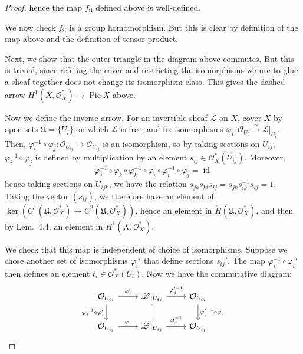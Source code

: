 \documentclass[10pt]{article}
\theoremstyle{definition}
\theoremstyle{remark}
\numberwithin{equation}{section}
\numberwithin{figure}{subsubsection}
\DeclareMathOperator{\Pic}{Pic}
\DeclareMathOperator{\id}{id}
\newcommand{\LL}{\mathscr{L}}
\newcommand{\OO}{\mathcal{O}}
\newcommand{\isoto}{\overset{\sim}{\to}}
\begin{document}
\begin{proof}
  hence the map $f_\mathfrak{U}$ defined above is well-defined.
  \par We now check $f_\mathfrak{U}$ is a group homomorphism. But this is clear
  by definition of the map above and the definition of tensor product.
  \par Next, we show that the outer triangle in the diagram above commutes. But
  this is trivial, since refining the cover and restricting the isomorphisms we
  use to glue a sheaf together does not change its isomorphism class. This gives
  the dashed arrow $H^1(X,\OO_X^*) \to \Pic X$ above.
  \par Now we define the inverse arrow.
  For an invertible sheaf $\LL$ on $X$, cover $X$ by open sets $\mathfrak{U} =
  \{U_i\}$ on which
  $\LL$ is free, and fix isomorphisms $\varphi_i\colon \OO_{U_i} \isoto
  \LL\rvert_{U_i}$. Then, $\varphi_i^{-1} \circ \varphi_j \colon
  \OO_{U_{ij}} \to \OO_{U_{ij}}$ is an isomorphism, so by taking sections on
  $U_{ij}$, $\varphi_i^{-1} \circ \varphi_j$ is defined by multiplication by an
  element $s_{ij} \in \OO^*_X(U_{ij})$. Moreover,
  \begin{equation*}
    \varphi_j^{-1} \circ \varphi_k \circ \varphi_k^{-1} \circ \varphi_i \circ
    \varphi_i^{-1} \circ \varphi_j = \id
  \end{equation*}
  hence taking sections on $U_{ijk}$, we have the relation
  $s_{jk}s_{ki}s_{ij} = s_{jk}s_{ik}^{-1}s_{ij} = 1$. Taking the vector
  $(s_{ij})$, we therefore have an element of $\ker(C^1(\mathfrak{U},\OO_X^*) \to
  C^2(\mathfrak{U},\OO_X^*))$, hence an element in
  $\check{H}(\mathfrak{U},\OO_X^*)$, and then by Lem.\ 4.4, an element in
  $H^1(X,\OO_X^*)$.
  \par We check that this map is independent of choice of isomorphisms.
  Suppose we chose another set of
  isomorphisms $\varphi_i'$ that define sections $s_{ij}'$.
  The map $\varphi_i^{-1} \circ \varphi_i'$ then
  defines an element $t_i \in \OO_X^*(U_i)$. Now we have the commutative
  diagram:
  \begin{equation*}
    \begin{tikzcd}
      \OO_{U_{ij}} \rar{\varphi_i'}\dar[swap]{\varphi_i^{-1} \circ \varphi_i'} &
      \LL\rvert_{U_{ij}} \rar{\varphi_j^{\prime-1}}\dar[equal] &
      \OO_{U_{ij}} \dar{\varphi_j^{\prime-1} \circ \varphi_j}\\
      \OO_{U_{ij}} \rar{\varphi_i} & \LL\rvert_{U_{ij}} \rar{\varphi_j^{-1}} &
      \OO_{U_{ij}}
    \end{tikzcd}
  \end{equation*}

\end{proof}
\end{document}
